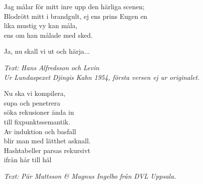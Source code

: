 Jag målar för mitt inre upp den härliga scenen;\\
Blodrött mitt i brandgult, ej ens prins Eugen en\\
lika mustig vy kan måla, \\
ens om han målade med sked.\par
\vspace{10pt}
Ja, nu skall vi ut och härja...\par
\vspace{10pt}
{\footnotesize\textit{Text: Hans Alfredsson och Levin\\
Ur Lundaspexet Djingis Kahn 1954, första versen ej ur originalet.}}\par
\vspace{10pt}
Nu ska vi kompilera,\\
supa och penetrera\\
söka rekusioner ända in\\
till fixpunktssemantik.\\
Av induktion och basfall\\
blir man med lätthet asknall.\\
Hashtabeller parsas rekursivt\\
ifrån hår till häl\par
\vspace{10pt}
{\footnotesize\textit{Text: Pär Mattsson \& Magnus Ingelbo från DVL
    Uppsala.}}
